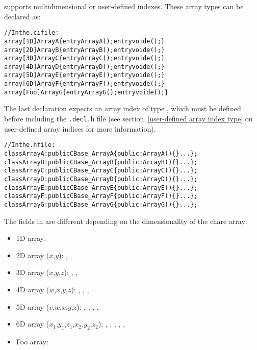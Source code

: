 \charmpp{} supports multidimensional or user-defined indexes. These array types
can be declared as:
%
\begin{alltt}
//In the .ci file:
array [1D]  ArrayA \{ entry ArrayA(); entry void e();\}
array [2D]  ArrayB \{ entry ArrayB(); entry void e();\}
array [3D]  ArrayC \{ entry ArrayC(); entry void e();\}
array [4D]  ArrayD \{ entry ArrayD(); entry void e();\}
array [5D]  ArrayE \{ entry ArrayE(); entry void e();\}
array [6D]  ArrayF \{ entry ArrayF(); entry void e();\}
array [Foo] ArrayG \{ entry ArrayG(); entry void e();\}
\end{alltt}
%
The last declaration expects an array index of type ,
which must be defined before including the \texttt{.decl.h} file (see
section~\ref{user-defined array index type} on user-defined array indices for
more information).
%
\begin{alltt}
//In the .h file:
class ArrayA : public CBase\_ArrayA \{ public: ArrayA()\{\} ...\};
class ArrayB : public CBase\_ArrayB \{ public: ArrayB()\{\} ...\};
class ArrayC : public CBase\_ArrayC \{ public: ArrayC()\{\} ...\};
class ArrayD : public CBase\_ArrayD \{ public: ArrayD()\{\} ...\};
class ArrayE : public CBase\_ArrayE \{ public: ArrayE()\{\} ...\};
class ArrayF : public CBase\_ArrayF \{ public: ArrayF()\{\} ...\};
class ArrayG : public CBase\_ArrayG \{ public: ArrayG()\{\} ...\};
\end{alltt}
%
The fields in  are different depending on the dimensionality of
the chare array:
%
\begin{itemize}
\item 1D array: 
\item 2D array ($x$,$y$): , 
\item 3D array ($x$,$y$,$z$): , ,
\item 4D array ($w$,$x$,$y$,$z$): , ,
  , 
\item 5D array ($v$,$w$,$x$,$y$,$z$): , ,
  , , 
\item 6D array ($x_1$,$y_1$,$z_1$,$x_2$,$y_2$,$z_2$): ,
  , , , ,
\item Foo array: 
\end{itemize}

